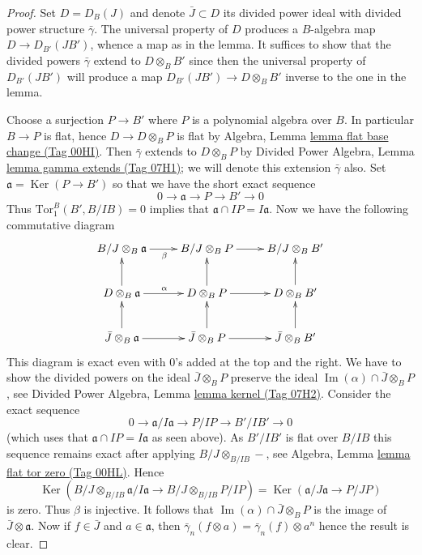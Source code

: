 \documentclass{amsart}
\theoremstyle{plain}
\theoremstyle{definition}
\theoremstyle{remark}
\numberwithin{equation}{subsection}
\def\Ker{\mathop{\mathrm{Ker}}}
\def\Im{\mathop{\mathrm{Im}}}
\begin{document}
\begin{proof}
Set $D = D_B(J)$ and denote $\bar J \subset D$ its divided power ideal
with divided power structure $\bar\gamma$. The universal property of
$D$ produces a $B$-algebra map $D \to D_{B'}(JB')$, whence a map as in
the lemma. It suffices to show that
the divided powers $\bar\gamma$ extend to $D \otimes_B B'$ since then
the universal property of $D_{B'}(JB')$ will produce a map
$D_{B'}(JB') \to D \otimes_B B'$ inverse to the one in the lemma.

\medskip\noindent
Choose a surjection $P \to B'$ where $P$ is a polynomial algebra over $B$.
In particular $B \to P$ is flat, hence $D \to D \otimes_B P$ is flat by
Algebra, Lemma \href{https://stacks.math.columbia.edu/tag/00HI}{lemma flat base change (Tag 00HI)}.
Then $\bar\gamma$ extends to $D \otimes_B P$ by
Divided Power Algebra, Lemma \href{https://stacks.math.columbia.edu/tag/07H1}{lemma gamma extends (Tag 07H1)}; we
will denote this extension
$\bar\gamma$ also. Set $\mathfrak a = \Ker(P \to B')$ so that
we have the short exact sequence
$$
0 \to \mathfrak a \to P \to B' \to 0
$$
Thus $\text{Tor}_1^B(B', B/IB) = 0$ implies that
$\mathfrak a \cap IP = I\mathfrak a$.
Now we have the following commutative diagram
$$
\xymatrix{
B/J \otimes_B \mathfrak a \ar[r]_\beta &
B/J \otimes_B P \ar[r] &
B/J \otimes_B B' \\
D \otimes_B \mathfrak a \ar[r]^\alpha \ar[u] &
D \otimes_B P \ar[r] \ar[u] &
D \otimes_B B' \ar[u] \\
\bar J \otimes_B \mathfrak a \ar[r] \ar[u] &
\bar J \otimes_B P \ar[r] \ar[u] &
\bar J \otimes_B B' \ar[u]
}
$$
This diagram is exact even with $0$'s added at the top and the right.
We have to show the divided powers on the ideal
$\bar J \otimes_B P$ preserve the ideal
$\Im(\alpha) \cap \bar J \otimes_B P$, see
Divided Power Algebra, Lemma \href{https://stacks.math.columbia.edu/tag/07H2}{lemma kernel (Tag 07H2)}.
Consider the exact sequence
$$
0 \to \mathfrak a/I\mathfrak a \to P/IP \to B'/IB' \to 0
$$
(which uses that $\mathfrak a \cap IP = I\mathfrak a$ as seen above).
As $B'/IB'$ is flat over $B/IB$ this sequence remains exact after
applying $B/J \otimes_{B/IB} -$, see
Algebra, Lemma \href{https://stacks.math.columbia.edu/tag/00HL}{lemma flat tor zero (Tag 00HL)}. Hence
$$
\Ker(B/J \otimes_{B/IB} \mathfrak a/I\mathfrak a \to
B/J \otimes_{B/IB} P/IP) =
\Ker(\mathfrak a/J\mathfrak a \to P/JP)
$$
is zero. Thus $\beta$ is injective. It follows that
$\Im(\alpha) \cap \bar J \otimes_B P$ is the
image of $\bar J \otimes \mathfrak a$. Now if
$f \in \bar J$ and $a \in \mathfrak a$, then
$\bar\gamma_n(f \otimes a) = \bar\gamma_n(f) \otimes a^n$
hence the result is clear.
\end{proof}
\end{document}
